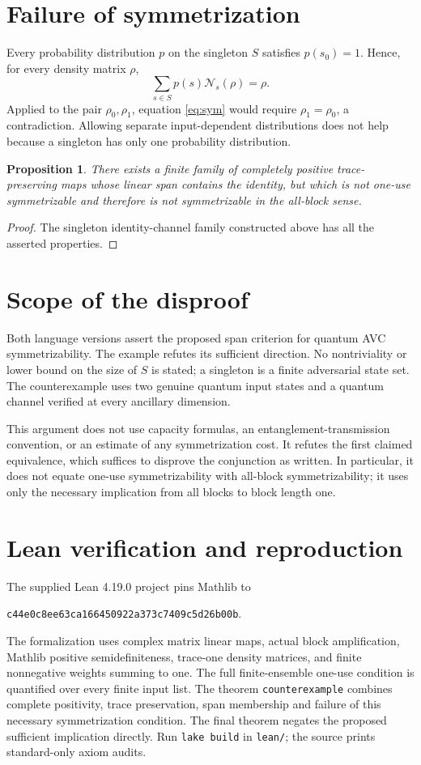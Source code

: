 \documentclass[11pt]{article}
\newtheorem{proposition}{Proposition}
\begin{document}
\newpage
\section*{Failure of symmetrization}
Every probability distribution $p$ on the singleton $S$ satisfies $p(s_0)=1$. Hence, for every density matrix $\rho$,
\[
 \sum_{s\in S}p(s)\mathcal N_s(\rho)=\rho.
\]
Applied to the pair $\rho_0,\rho_1$, equation \eqref{eq:sym} would require $\rho_1=\rho_0$, a contradiction. Allowing separate input-dependent distributions does not help because a singleton has only one probability distribution.

\begin{proposition}
There exists a finite family of completely positive trace-preserving maps whose linear span contains the identity, but which is not one-use symmetrizable and therefore is not symmetrizable in the all-block sense.
\end{proposition}
\begin{proof}
The singleton identity-channel family constructed above has all the asserted properties.
\end{proof}

\section*{Scope of the disproof}
Both language versions assert the proposed span criterion for quantum AVC symmetrizability. The example refutes its sufficient direction. No nontriviality or lower bound on the size of $S$ is stated; a singleton is a finite adversarial state set. The counterexample uses two genuine quantum input states and a quantum channel verified at every ancillary dimension.

This argument does not use capacity formulas, an entanglement-transmission convention, or an estimate of any symmetrization cost. It refutes the first claimed equivalence, which suffices to disprove the conjunction as written. In particular, it does not equate one-use symmetrizability with all-block symmetrizability; it uses only the necessary implication from all blocks to block length one.

\section*{Lean verification and reproduction}
The supplied Lean 4.19.0 project pins Mathlib to
\begin{center}\small\texttt{c44e0c8ee63ca166450922a373c7409c5d26b00b}.\end{center}
The formalization uses complex matrix linear maps, actual block amplification, Mathlib positive semidefiniteness, trace-one density matrices, and finite nonnegative weights summing to one. The full finite-ensemble one-use condition is quantified over every finite input list. The theorem \texttt{counterexample} combines complete positivity, trace preservation, span membership and failure of this necessary symmetrization condition. The final theorem negates the proposed sufficient implication directly. Run \texttt{lake build} in \texttt{lean/}; the source prints standard-only axiom audits.
\end{document}
